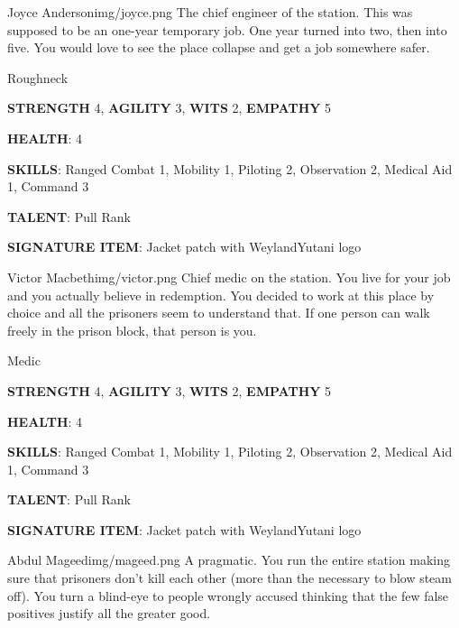 
\begin{rpg-pcbox}{Joyce Anderson}{img/joyce.png}
    The chief engineer of the station. This was supposed to be an one-year temporary job. One year turned into two, then into five. You would love to see the place collapse and get a job somewhere safer.
\end{rpg-pcbox}

\begin{rpg-commentbox}{}
    Roughneck

    \textbf{STRENGTH} 4, \textbf{AGILITY} 3, \textbf{WITS} 2, \textbf{EMPATHY} 5

    \textbf{HEALTH}: 4

    \textbf{SKILLS}: Ranged Combat 1, Mobility 1, Piloting 2, Observation 2, Medical Aid 1, Command 3
    
    \textbf{TALENT}: Pull Rank
    
    \textbf{SIGNATURE ITEM}: Jacket patch with WeylandYutani logo    
\end{rpg-commentbox}

\newsect

\begin{rpg-pcbox}{Victor Macbeth}{img/victor.png}
    Chief medic on the station. You live for your job and you actually believe in redemption. You decided to work at this place by choice and all the prisoners seem to understand that. If one person can walk freely in the prison block, that person is you.
\end{rpg-pcbox}

\begin{rpg-commentbox}{}
    Medic

    \textbf{STRENGTH} 4, \textbf{AGILITY} 3, \textbf{WITS} 2, \textbf{EMPATHY} 5

    \textbf{HEALTH}: 4

    \textbf{SKILLS}: Ranged Combat 1, Mobility 1, Piloting 2, Observation 2, Medical Aid 1, Command 3
    
    \textbf{TALENT}: Pull Rank
    
    \textbf{SIGNATURE ITEM}: Jacket patch with WeylandYutani logo    
\end{rpg-commentbox}


\newsect

\medskip \medskip \medskip \medskip \medskip \medskip \medskip \medskip


\begin{rpg-pcbox}{Abdul Mageed}{img/mageed.png}
    A pragmatic. You run the entire station making sure that prisoners don't kill each other (more than the necessary to blow steam off). You turn a blind-eye to people wrongly accused thinking that the few false positives justify all the greater good.
\end{rpg-pcbox}


